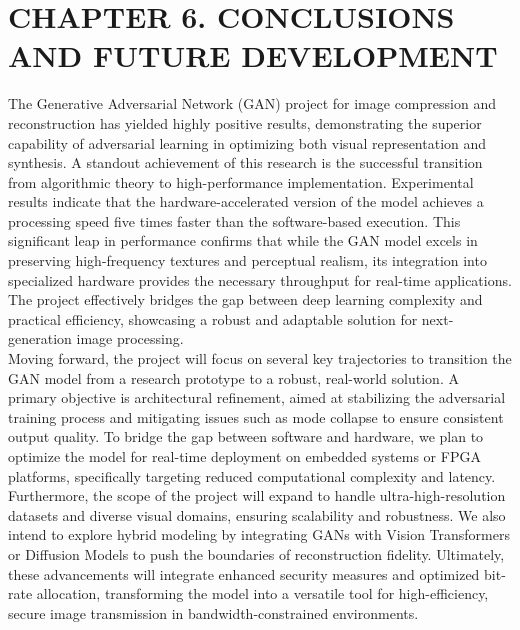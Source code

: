 \newpage
\section*{CHAPTER 6. CONCLUSIONS AND FUTURE DEVELOPMENT}
\setcounter{section}{6}
\setcounter{subsection}{0}
\setcounter{subsubsection}{0}
\setcounter{paragraph}{0}
\setcounter{figure}{0}
\setcounter{table}{0}

The Generative Adversarial Network (GAN) project for image compression and reconstruction has yielded highly positive results, demonstrating the superior capability of adversarial learning in optimizing both visual representation and synthesis. A standout achievement of this research is the successful transition from algorithmic theory to high-performance implementation. Experimental results indicate that the hardware-accelerated version of the model achieves a processing speed five times faster than the software-based execution. This significant leap in performance confirms that while the GAN model excels in preserving high-frequency textures and perceptual realism, its integration into specialized hardware provides the necessary throughput for real-time applications. The project effectively bridges the gap between deep learning complexity and practical efficiency, showcasing a robust and adaptable solution for next-generation image processing.\\

Moving forward, the project will focus on several key trajectories to transition the GAN model from a research prototype to a robust, real-world solution. A primary objective is architectural refinement, aimed at stabilizing the adversarial training process and mitigating issues such as mode collapse to ensure consistent output quality. To bridge the gap between software and hardware, we plan to optimize the model for real-time deployment on embedded systems or FPGA platforms, specifically targeting reduced computational complexity and latency. Furthermore, the scope of the project will expand to handle ultra-high-resolution datasets and diverse visual domains, ensuring scalability and robustness. We also intend to explore hybrid modeling by integrating GANs with Vision Transformers or Diffusion Models to push the boundaries of reconstruction fidelity. Ultimately, these advancements will integrate enhanced security measures and optimized bit-rate allocation, transforming the model into a versatile tool for high-efficiency, secure image transmission in bandwidth-constrained environments.
